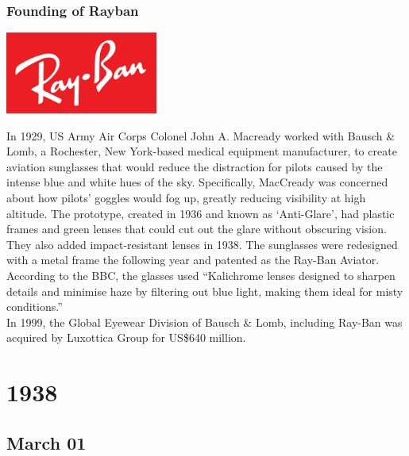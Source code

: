 \documentclass[11pt]{report}
\begin{document}
\subsection{Founding of Rayban}
\vspace{2mm}\begin{center}\includegraphics[width=5cm]{./img/raybanLogo.jpg}\end{center}
In 1929, US Army Air Corps Colonel John A. Macready worked with Bausch \& Lomb, a Rochester, New York-based medical equipment manufacturer, to create aviation sunglasses that would reduce the distraction for pilots caused by the intense blue and white hues of the sky. Specifically, MacCready was concerned about how pilots' goggles would fog up, greatly reducing visibility at high altitude. The prototype, created in 1936 and known as ‘Anti-Glare’, had plastic frames and green lenses that could cut out the glare without obscuring vision. They also added impact-resistant lenses in 1938. The sunglasses were redesigned with a metal frame the following year and patented as the Ray-Ban Aviator. According to the BBC, the glasses used “Kalichrome lenses designed to sharpen details and minimise haze by filtering out blue light, making them ideal for misty conditions.”\\
\indent In 1999, the Global Eyewear Division of Bausch \& Lomb, including Ray-Ban was acquired by Luxottica Group for US\$640 million.

\chapter{1938}
\section{March 01}
\end{document}
